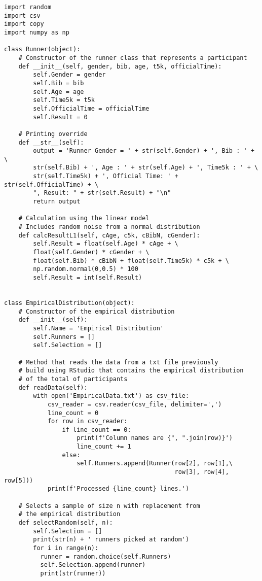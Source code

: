 \documentclass[11pt, oneside]{article}   	%
\begin{document}
\begin{lstlisting}
import random
import csv
import copy
import numpy as np

class Runner(object):
    # Constructor of the runner class that represents a participant
    def __init__(self, gender, bib, age, t5k, officialTime):
        self.Gender = gender
        self.Bib = bib
        self.Age = age
        self.Time5k = t5k
        self.OfficialTime = officialTime
        self.Result = 0
        
    # Printing override
    def __str__(self):
        output = 'Runner Gender = ' + str(self.Gender) + ', Bib : ' + \
        str(self.Bib) + ', Age : ' + str(self.Age) + ', Time5k : ' + \
        str(self.Time5k) + ', Official Time: ' + str(self.OfficialTime) + \
        ", Result: " + str(self.Result) + "\n"
        return output
    
    # Calculation using the linear model
    # Includes random noise from a normal distribution
    def calcResultL1(self, cAge, c5k, cBibN, cGender):
        self.Result = float(self.Age) * cAge + \
        float(self.Gender) * cGender + \
        float(self.Bib) * cBibN + float(self.Time5k) * c5k + \
        np.random.normal(0,0.5) * 100
        self.Result = int(self.Result)
        
      
class EmpiricalDistribution(object):
    # Constructor of the empirical distribution
    def __init__(self):
        self.Name = 'Empirical Distribution'
        self.Runners = []
        self.Selection = []
        
    # Method that reads the data from a txt file previously 
    # build using RStudio that contains the empirical distribution
    # of the total of participants
    def readData(self):
        with open('EmpiricalData.txt') as csv_file:
            csv_reader = csv.reader(csv_file, delimiter=',')
            line_count = 0
            for row in csv_reader:
                if line_count == 0:
                    print(f'Column names are {", ".join(row)}')
                    line_count += 1
                else:
                    self.Runners.append(Runner(row[2], row[1],\
                                               row[3], row[4], row[5]))
            print(f'Processed {line_count} lines.')
    
    # Selects a sample of size n with replacement from 
    # the empirical distribution
    def selectRandom(self, n):
        self.Selection = []
        print(str(n) + ' runners picked at random')
        for i in range(n):
          runner = random.choice(self.Runners)
          self.Selection.append(runner)
          print(str(runner))
          

\end{lstlisting}
\end{document}
